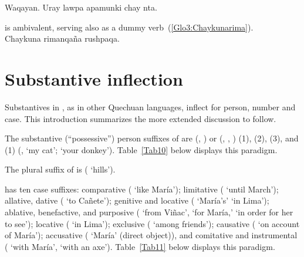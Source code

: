 %
{Waqayan. Uray lawpa apamunki chay nta.}%
{}%
{}{}%

\noindent
{} is ambivalent, serving also as a dummy verb~(\ref{Glo3:Chaykunarima}).\\

%
{Chaykuna rimanqaña rushpaqa.}%
{}%
{}{}%

\section{Substantive inflection}
Substantives in \SYQ, as in other Quechuan languages, inflect for person, number and case. This introduction summarizes the more extended discussion to follow. 

The substantive (“possessive”) person suffixes of \SYQ{} are  (\AMV, \LT) or \phono{-:} (\ACH, \CH, \SP) (1),  (2),  (3), and  (1) (,  ‘my cat’;  ‘your donkey’). Table~\ref{Tab10} below displays this paradigm.

The plural suffix of \SYQ{} is  ( ‘hills’).

\SYQ{} has ten case suffixes: comparative  ( ‘like María’); limitative  ( ‘until March’); allative, dative  ( ‘to Cañete’); genitive and locative  ( ‘María’s’  ‘in Lima’); ablative, benefactive, and purposive  ( ‘from Viñac’,  ‘for María,’  ‘in order for her to see’); locative  ( ‘in Lima’); exclusive  ( ‘among friends’); causative  ( ‘on account of María’); accusative  ( ‘María’ (direct object)), and comitative and instrumental  ( ‘with María’,  ‘with an axe’). Table~\ref{Tab11} below displays this paradigm.

